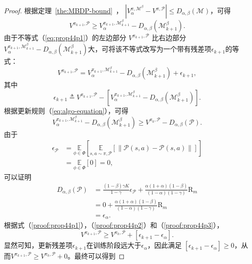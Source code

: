 \begin{proof}

根据定理~\ref{the:MBDP-bound}~， $\left|{V}_\alpha^{\pi, \mathcal{M}^\beta}-{V}^{\pi, \mathcal{P}}\right|\leq D_{\alpha,\beta}(\mathcal{M})$，可得
\begin{equation}\label{eq:prop44p1}
{V}^{\pi_{k+1}, \mathcal{P}} \geq {V}_{\alpha}^{\pi_{k+1}, \mathcal{M}_{k+1}^\beta}-D_{\alpha,\beta}(\mathcal{M}_{k+1}^\beta).
\end{equation}
由于不等式（\ref{eq:prop44p1}）的左边部分 ${V}^{\pi_{k+1}, \mathcal{P}}$ 比右边部分${V}_{\alpha}^{\pi_{k+1}, \mathcal{M}_{k+1}^\beta}-D_{\alpha,\beta}(\mathcal{M}_{k+1}^\beta)$大，可将该不等式改写为一个带有残差项$\epsilon_{k+1}$的等式：
\begin{equation}\label{proof:prop44p1}
{V}^{\pi_{k+1}, \mathcal{P}} = {V}_{\alpha}^{\pi_{k+1}, \mathcal{M}_{k+1}^\beta}-D_{\alpha,\beta}(\mathcal{M}_{k+1}^\beta) + \epsilon_{k+1},
\end{equation}
其中
\begin{equation}
\epsilon_{k+1} \triangleq {V}^{\pi_{k+1}, \mathcal{P}} - \left[{V}_{\alpha}^{\pi_{k+1}, \mathcal{M}_{k+1}^\beta} - D_{\alpha,\beta}(\mathcal{M}_{k+1}^\beta)\right].
\end{equation}
根据更新规则（\ref{eq:algo-equation}），可得
\begin{equation}\label{proof:prop44p2}
{V}_{\alpha}^{\pi_{k+1}, \mathcal{M}_{k+1}^\beta}-D_{\alpha,\beta}(\mathcal{M}_{k+1}^\beta) \geq {V}^{\pi_k,\mathcal{P}}-D_{\alpha,\beta}(\mathcal{P}).
\end{equation}
由于
\begin{equation}
\begin{aligned}
\epsilon_{\mathcal{P}} &= \underset{\phi\in\Phi}{\mathbb{E}}\left[\underset{s,a\sim \pi,\mathcal{P}}{\mathbb{E}}\left[\left\|\mathcal{P}(s, a)-\mathcal{P}(s, a)\right\|\right]\right]\\
&=\underset{\phi\in\Phi}{\mathbb{E}}\left[0\right] = 0,
\end{aligned}
\end{equation}
可以证明
\begin{equation}
\begin{aligned}
D_{\alpha,\beta}(\mathcal{P}) &= \frac{(1-\beta)\gamma K}{1-\gamma}\epsilon_{\mathcal{P}}+\frac{\alpha(1+\alpha)(1-\beta)}{(1-\alpha)(1-\gamma)}\mathrm{R}_m\\
&=0+\frac{\alpha(1+\alpha)(1-\beta)}{(1-\alpha)(1-\gamma)}\mathrm{R}_m\\
&=\epsilon_\alpha.
\label{proof:prop44p3}
\end{aligned}
\end{equation}
根据式（\ref{proof:prop44p1}），（\ref{proof:prop44p2}）和（\ref{proof:prop44p3}），
\begin{equation}
{V}^{\pi_{k+1}, \mathcal{P}}\geq {V}^{\pi_{k}, \mathcal{P}} + \left[\epsilon_{k+1} - \epsilon_\alpha\right].
\end{equation}
显然可知，更新残差项$\epsilon_{k+1}$在训练阶段远大于$\epsilon_\alpha$，因此满足 $\left[\epsilon_{k+1} - \epsilon_\alpha\right]\geq 0$，从而${V}^{\pi_{k+1}, \mathcal{P}}\geq{V}^{\pi_{k}, \mathcal{P}}+0$。最终可以得到


\end{proof}
